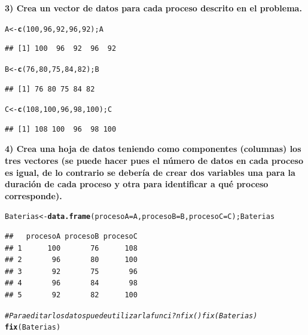 \documentclass[12pt,letterpaper]{article}\usepackage[]{graphicx}\usepackage[]{color}
\makeatletter
\newcommand{\hlnum}[1]{\textcolor[rgb]{0.686,0.059,0.569}{#1}}%
\newcommand{\hlcom}[1]{\textcolor[rgb]{0.678,0.584,0.686}{\textit{#1}}}%
\newcommand{\hlstd}[1]{\textcolor[rgb]{0.345,0.345,0.345}{#1}}%
\newcommand{\hlkwb}[1]{\textcolor[rgb]{0.69,0.353,0.396}{#1}}%
\newcommand{\hlkwc}[1]{\textcolor[rgb]{0.333,0.667,0.333}{#1}}%
\newcommand{\hlkwd}[1]{\textcolor[rgb]{0.737,0.353,0.396}{\textbf{#1}}}%
\newenvironment{kframe}{%
 \def\at@end@of@kframe{}%
 \ifinner\ifhmode%
  \def\at@end@of@kframe{\end{minipage}}%
  \begin{minipage}{\columnwidth}%
 \fi\fi%
 \def\FrameCommand##1{\hskip\@totalleftmargin \hskip-\fboxsep
 \colorbox{shadecolor}{##1}\hskip-\fboxsep
     \hskip-\linewidth \hskip-\@totalleftmargin \hskip\columnwidth}%
 \MakeFramed {\advance\hsize-\width
   \@totalleftmargin\z@ \linewidth\hsize
   \@setminipage}}%
 {\par\unskip\endMakeFramed%
 \at@end@of@kframe}
\newenvironment{knitrout}{}{} %
\makeatother
\begin{document}
\textbf{3) Crea un vector de datos para cada proceso descrito en el problema.} 
\begin{knitrout}
\color{fgcolor}\begin{kframe}
\begin{alltt}
\hlstd{A} \hlkwb{<-} \hlkwd{c}\hlstd{(}\hlnum{100}\hlstd{,}\hlnum{96}\hlstd{,}\hlnum{92}\hlstd{,}\hlnum{96}\hlstd{,}\hlnum{92}\hlstd{); A}
\end{alltt}
\begin{verbatim}
## [1] 100  96  92  96  92
\end{verbatim}
\begin{alltt}
\hlstd{B} \hlkwb{<-} \hlkwd{c}\hlstd{(}\hlnum{76}\hlstd{,}\hlnum{80}\hlstd{,}\hlnum{75}\hlstd{,}\hlnum{84}\hlstd{,}\hlnum{82}\hlstd{); B}
\end{alltt}
\begin{verbatim}
## [1] 76 80 75 84 82
\end{verbatim}
\begin{alltt}
\hlstd{C} \hlkwb{<-} \hlkwd{c}\hlstd{(}\hlnum{108}\hlstd{,}\hlnum{100}\hlstd{,}\hlnum{96}\hlstd{,}\hlnum{98}\hlstd{,}\hlnum{100}\hlstd{); C}
\end{alltt}
\begin{verbatim}
## [1] 108 100  96  98 100
\end{verbatim}
\end{kframe}
\end{knitrout}
\textbf{4) Crea una hoja de datos teniendo como componentes (columnas) los tres vectores (se puede hacer
pues el n\'umero de datos en cada proceso es igual, de lo contrario se deber\'ia de crear dos variables
una para la duraci\'on de cada proceso y otra para identificar a qu\'e proceso corresponde).} 
\begin{knitrout}
\color{fgcolor}\begin{kframe}
\begin{alltt}
\hlstd{Baterias} \hlkwb{<-} \hlkwd{data.frame}\hlstd{(}\hlkwc{procesoA}\hlstd{=A,} \hlkwc{procesoB}\hlstd{=B,} \hlkwc{procesoC}\hlstd{=C);Baterias}
\end{alltt}
\begin{verbatim}
##   procesoA procesoB procesoC
## 1      100       76      108
## 2       96       80      100
## 3       92       75       96
## 4       96       84       98
## 5       92       82      100
\end{verbatim}
\begin{alltt}
\hlcom{# Para editar los datos puede utilizar la funci?n fix() fix(Baterias)}
\hlkwd{fix}\hlstd{(Baterias)}
\end{alltt}
\end{kframe}
\end{knitrout}
\end{document}
